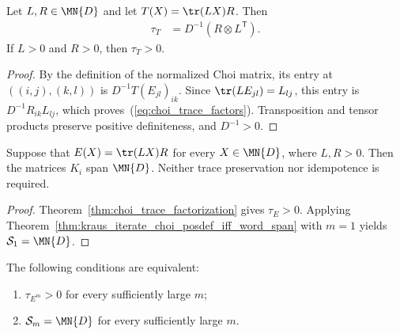 \begin{theorem}
    \label{thm:choi_trace_factorization}
    \leanok
    Let $L,R\in\MN{D}$ and let $T(X)=\tr(LX)R$. Then
    \begin{align}
        \tau_T&=D^{-1}(R\otimes L^{\mathsf T}).
        \label{eq:choi_trace_factors}
    \end{align}
    If $L>0$ and $R>0$, then $\tau_T>0$.
\end{theorem}

\begin{proof}
    \leanok
    By the definition of the normalized Choi matrix, its entry at
    $((i,j),(k,l))$ is $D^{-1}T(E_{jl})_{ik}$.
    Since $\tr(LE_{jl})=L_{lj}$, this entry is $D^{-1}R_{ik}L_{lj}$,
    which proves~(\ref{eq:choi_trace_factors}). Transposition and tensor
    products preserve positive definiteness, and $D^{-1}>0$.
\end{proof}

\begin{theorem}
    \label{thm:kraus_injective_trace_factors}
    \leanok
    Suppose that $E(X)=\tr(LX)R$ for every $X\in\MN{D}$, where
    $L,R>0$. Then the matrices $K_i$ span $\MN{D}$.
    Neither trace preservation nor idempotence is required.
\end{theorem}

\begin{proof}
    \leanok
    Theorem~\ref{thm:choi_trace_factorization} gives $\tau_E>0$.
    Applying Theorem~\ref{thm:kraus_iterate_choi_posdef_iff_word_span}
    with $m=1$ yields $\mathcal S_1=\MN{D}$.
\end{proof}

\begin{corollary}
    \label{cor:kraus_iterate_eventual_choi_posdef}
    \leanok
    The following conditions are equivalent:
    \begin{enumerate}
        \item $\tau_{E^m}>0$ for every sufficiently large $m$;
        \item $\mathcal S_m=\MN{D}$ for every sufficiently large $m$.
    \end{enumerate}
\end{corollary}

